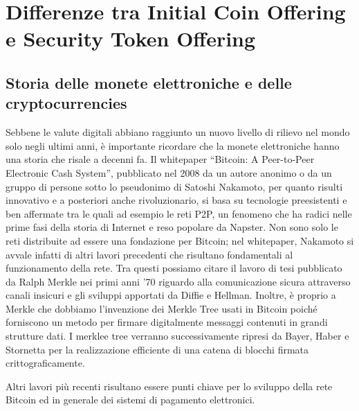 \chapter{Differenze tra Initial Coin Offering e Security Token Offering}                %
\lhead[\fancyplain{}{\bfseries\thepage}]{\fancyplain{}{\bfseries\rightmark}}


\section{Storia delle monete elettroniche e delle cryptocurrencies}

Sebbene le valute digitali abbiano raggiunto un nuovo livello di rilievo nel mondo solo negli ultimi anni, è importante ricordare che la monete elettroniche hanno una storia che risale a decenni fa. Il whitepaper “Bitcoin: A Peer-to-Peer Electronic Cash System”\cite{K1}, pubblicato nel 2008 da un autore anonimo o da un gruppo di persone sotto lo pseudonimo di Satoshi Nakamoto, per quanto risulti innovativo e a posteriori anche rivoluzionario, si basa su tecnologie preesistenti e ben affermate tra le quali ad esempio le reti P2P, un fenomeno che ha radici nelle prime fasi della storia di Internet e reso popolare da Napster. Non sono solo le reti distribuite ad essere una fondazione per Bitcoin; nel whitepaper, Nakamoto si avvale infatti di altri lavori precedenti che risultano fondamentali al funzionamento della rete. Tra questi possiamo citare il lavoro di tesi pubblicato da Ralph Merkle nei primi anni ’70  riguardo alla comunicazione sicura attraverso canali insicuri e gli sviluppi apportati da Diffie e Hellman\cite{K2,k3}. Inoltre, è proprio a Merkle che dobbiamo l’invenzione dei Merkle Tree usati in Bitcoin poiché forniscono un metodo per firmare digitalmente messaggi contenuti in grandi strutture dati\cite{K4}. I merklee tree verranno successivamente ripresi da Bayer, Haber e Stornetta per la realizzazione efficiente di una catena di blocchi firmata crittograficamente\cite{K5}.


Altri lavori più recenti risultano essere punti chiave per lo sviluppo della rete Bitcoin ed in generale dei sistemi di pagamento elettronici.


